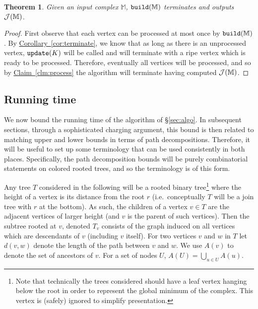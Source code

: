\documentclass[11pt]{article}
\newtheorem{theorem}{Theorem}[section]
\theoremstyle{definition}
\newcommand{\cJ}{{\cal J}}
\newcommand{\MM}{\mathbb{M}}
\newcommand{\Sec}[1]{\hyperref[sec:#1]{\S\ref*{sec:#1}}} %
\newcommand{\Clm}[1]{\hyperref[clm:#1]{Claim~\ref*{clm:#1}}} %
\newcommand{\Cor}[1]{\hyperref[cor:#1]{Corollary~\ref*{cor:#1}}} %
\newcommand{\build}{{\tt build}}
\newcommand{\update}{{\tt update}}
\begin{document}
\begin{theorem}
\label{thm:correct}
 Given an input complex $\MM$, $\build(\MM)$ terminates and outputs $\cJ(\MM)$.
\end{theorem}
\begin{proof}
 First observe that each vertex can be processed at most once by $\build(\MM)$.  By \Cor{terminate}, we know that as long as there 
 is an unprocessed vertex, $\update(K)$ will be called and will terminate with a ripe vertex which is ready to be processed. 
 Therefore, eventually all vertices will be processed, and so by \Clm{process} the algorithm will terminate having 
 computed $\cJ(\MM)$.
\end{proof}




\subsection{Running time}
\label{sec:runTime}

We now bound the running time of the algorithm of \Sec{algo}.  
In subsequent sections, through a sophisticated charging argument, this bound is then related to matching upper 
and lower bounds in terms of path decompositions. 
Therefore, it will be useful to set up some terminology that can 
be used consistently in both places.  Specifically, the path decomposition bounds will be purely combinatorial 
statements on colored rooted trees, and so the terminology is of this form.

Any tree $T$ considered in the following will be a rooted binary tree\footnote{Note 
that technically the trees considered should have a leaf vertex hanging below the root  
in order to represent the global minimum of the complex.  This vertex is 
(safely) ignored to simplify presentation.} where the height of a vertex is its distance 
from the root $r$ (i.e.\ conceptually $T$ will be a join tree with $r$ at the bottom).  
As such, the children of a vertex $v\in T$ are the adjacent vertices of larger height
(and $v$ is the parent of such vertices).  Then the subtree rooted at $v$, denoted $T_v$ consists of the graph induced on all 
vertices which are descendants of $v$ (including $v$ itself).  For two vertices $v$ and $w$ in $T$ let $d(v,w)$ denote the 
length of the path between $v$ and $w$.
We use $A(v)$ to denote the set of ancestors of $v$.
For a set of nodes $U$, $A(U) = \bigcup_{u \in U} A(u)$.
\end{document}
